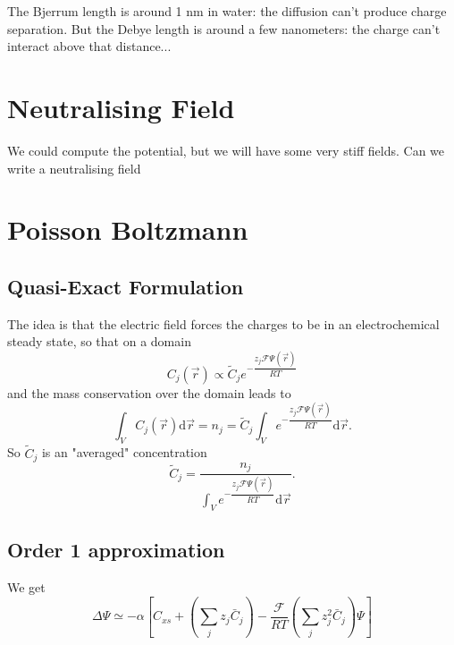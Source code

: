 \documentclass{revtex4}
\begin{document}
The Bjerrum length is around 1 nm in water: the diffusion can't produce charge separation.
But the Debye length is around a few nanometers: the charge can't interact above that distance...

\section{Neutralising Field}
We could compute the potential, but we will have some very stiff fields.
Can we write a neutralising field 

\section{Poisson Boltzmann}
\subsection{Quasi-Exact Formulation}
The idea is that the electric field forces the charges to be in an electrochemical steady
state, so that on a domain
\begin{equation}
	C_j(\vec{r}) \propto \tilde{C}_j e^{-\dfrac{z_j\mathcal{F}\Psi(\vec{r})}{RT}}
\end{equation}
and the mass conservation over the domain leads to
\begin{equation}
	\int_V  C_j(\vec{r}) \mathrm{d}\vec{r} = n_j = \tilde{C}_j \int_V e^{-\dfrac{z_j\mathcal{F}\Psi(\vec{r})}{RT}} \mathrm{d}\vec{r}.
\end{equation}
So $\tilde{C}_j$ is an "averaged" concentration
$$
	\tilde{C}_j = \dfrac{n_j}{\int_V e^{-\dfrac{z_j\mathcal{F}\Psi(\vec{r})}{RT}} \mathrm{d}\vec{r}}.
$$
\subsection{Order 1 approximation}
We get
\begin{equation}
	\Delta \Psi 
	\simeq -\alpha \left[ 	C_{xs} 
							+\left(\sum_j{z_j\bar{C}_j}\right)
							- \dfrac{\mathcal{F}}{RT}\left(\sum_j z_j^2\bar{C}_j\right) \Psi
							\right]
\end{equation}
\end{document}
